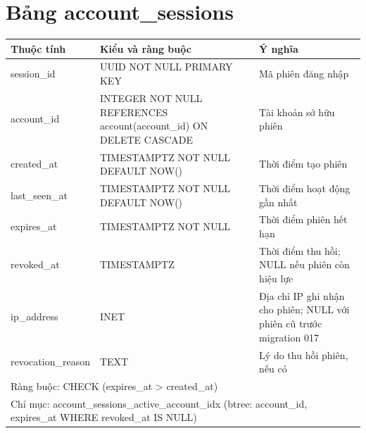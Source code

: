 \section{Bảng account\_sessions}
\begin{longtable}{|p{}|p{}|p{}|}\hline
\textbf{Thuộc tính}&\textbf{Kiểu và ràng buộc}&\textbf{Ý nghĩa}\\\hline\endhead
session\_id & UUID NOT NULL PRIMARY KEY & Mã phiên đăng nhập\\\hline
account\_id & INTEGER NOT NULL REFERENCES account(account\_id) ON DELETE CASCADE & Tài khoản sở hữu phiên\\\hline
created\_at & TIMESTAMPTZ NOT NULL DEFAULT NOW() & Thời điểm tạo phiên\\\hline
last\_seen\_at & TIMESTAMPTZ NOT NULL DEFAULT NOW() & Thời điểm hoạt động gần nhất\\\hline
expires\_at & TIMESTAMPTZ NOT NULL & Thời điểm phiên hết hạn\\\hline
revoked\_at & TIMESTAMPTZ & Thời điểm thu hồi; NULL nếu phiên còn hiệu lực\\\hline
ip\_address & INET & Địa chỉ IP ghi nhận cho phiên; NULL với phiên cũ trước migration 017\\\hline
revocation\_reason & TEXT & Lý do thu hồi phiên, nếu có\\\hline
\multicolumn{3}{|p{0.93\textwidth}|}{Ràng buộc: CHECK (expires\_at > created\_at)}\\\hline
\multicolumn{3}{|p{0.93\textwidth}|}{Chỉ mục: account\_sessions\_active\_account\_idx (btree: account\_id, expires\_at WHERE revoked\_at IS NULL)}\\\hline
\end{longtable}
\normalsize
